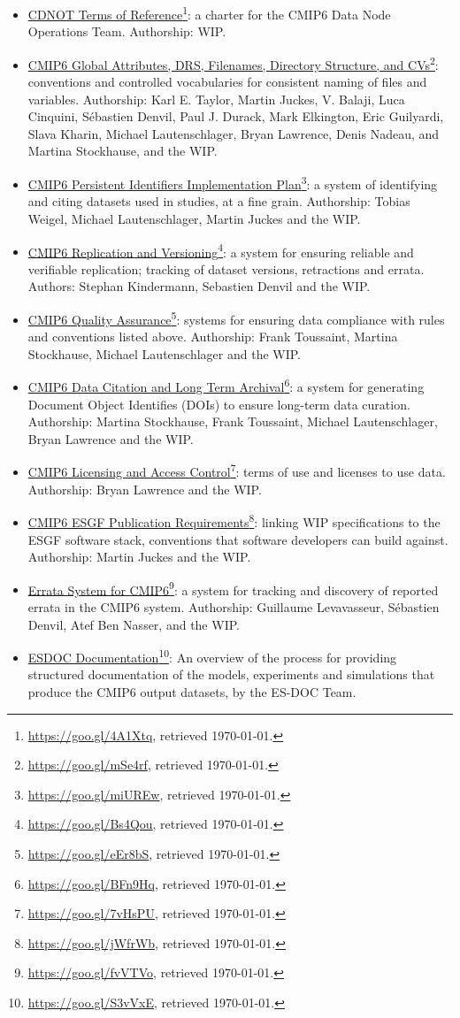\documentclass[gmd,manuscript]{copernicus}
\newcommand{\urlref}[2] {\href{#1}{#2}\footnote{\url{#1}, retrieved \today.}}
\begin{document}
\begin{itemize}
\item \urlref{https://goo.gl/4A1Xtq}{CDNOT Terms of Reference}: a
  charter for the CMIP6 Data Node Operations Team. Authorship: WIP.
\item \urlref{https://goo.gl/mSe4rf}{CMIP6 Global Attributes, DRS,
    Filenames, Directory Structure, and CVs}: conventions and
  controlled vocabularies for consistent naming of files and
  variables. Authorship: Karl E. Taylor, Martin Juckes, V. Balaji,
  Luca Cinquini, Sébastien Denvil, Paul J. Durack, Mark Elkington,
  Eric Guilyardi, Slava Kharin, Michael Lautenschlager, Bryan
  Lawrence, Denis Nadeau, and Martina Stockhause, and the WIP.
\item \urlref{https://goo.gl/miUREw}{CMIP6 Persistent Identifiers
    Implementation Plan}: a system of identifying and citing datasets
  used in studies, at a fine grain. Authorship: Tobias Weigel, Michael
  Lautenschlager, Martin Juckes and the WIP.
\item \urlref{https://goo.gl/Bs4Qou}{CMIP6 Replication and Versioning}:
  a system for ensuring reliable and verifiable replication; tracking
  of dataset versions, retractions and errata. Authors: Stephan
  Kindermann, Sebastien Denvil and the WIP.
\item \urlref{https://goo.gl/eEr8bS}{CMIP6 Quality Assurance}: systems
  for ensuring data compliance with rules and conventions listed
  above. Authorship: Frank Toussaint, Martina Stockhause, Michael
  Lautenschlager and the WIP.
\item \urlref{https://goo.gl/BFn9Hq}{CMIP6 Data Citation and Long Term
    Archival}: a system for generating Document Object Identifies
  (DOIs) to ensure long-term data curation. Authorship: Martina
  Stockhause, Frank Toussaint, Michael Lautenschlager, Bryan Lawrence
  and the WIP.
\item \urlref{https://goo.gl/7vHsPU}{CMIP6 Licensing and Access
    Control}: terms of use and licenses to use data. Authorship: Bryan
  Lawrence and the WIP.
\item \urlref{https://goo.gl/jWfrWb}{CMIP6 ESGF Publication
    Requirements}: linking WIP specifications to the ESGF software
  stack, conventions that software developers can build against.
  Authorship: Martin Juckes and the WIP.
\item \urlref{https://goo.gl/fvVTVo}{Errata System for CMIP6}: a system
  for tracking and discovery of reported errata in the CMIP6 system.
  Authorship: Guillaume Levavasseur, Sébastien Denvil, Atef Ben
  Nasser, and the WIP.
\item \urlref{https://goo.gl/S3vVxE}{ESDOC Documentation}: An overview
  of the process for providing structured documentation of the models,
  experiments and simulations that produce the CMIP6 output datasets,
  by the ES-DOC Team.
\end{itemize}
\end{document}
